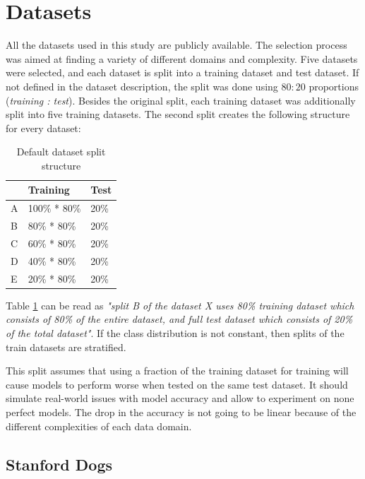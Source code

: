 \section{Datasets}\label{section:datasets}

All the datasets used in this study are publicly available. The selection process was aimed at finding a variety of different domains and complexity. Five datasets were selected, and each dataset is split into a training dataset and test dataset. If not defined in the dataset description, the split was done using $80:20$ proportions (\textit{training : test}). Besides the original split, each training dataset was additionally split into five training datasets. The second split creates the following structure for every dataset:

\begin{table}[ht]
\centering
\caption{Default dataset split structure}
\label{tab:dataset-split}
\begin{tabular}{|l|l|l|}
\hline
  & Training     & Test \\ \hline
A & 100\% * 80\% & 20\% \\ \hline
B & 80\% * 80\%  & 20\% \\ \hline
C & 60\% * 80\%  & 20\% \\ \hline
D & 40\% * 80\%  & 20\% \\ \hline
E & 20\% * 80\%  & 20\% \\ \hline
\end{tabular}
\end{table}

Table \ref{tab:dataset-split} can be read as \textit{"split B of the dataset X uses 80\% training dataset which consists of 80\% of the entire dataset, and full test dataset which consists of 20\% of the total dataset"}. If the class distribution is not constant, then splits of the train datasets are stratified. 

\begin{remark}\label{remark:performance-drop-while-train}
This split assumes that using a fraction of the training dataset for training will cause models to perform worse when tested on the same test dataset. It should simulate real-world issues with model accuracy and allow to experiment on none perfect models. The drop in the accuracy is not going to be linear because of the different complexities of each data domain.
\end{remark}

\subsection{Stanford Dogs}

